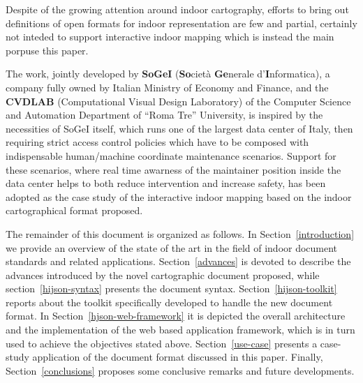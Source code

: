 Despite of the growing attention around indoor cartography, efforts to bring out definitions of open formats for indoor representation are few and partial, certainly not inteded to support interactive indoor mapping which is instead the main porpuse this paper. 

The work, jointly developed by {\bf SoGeI} ({\bf So}ciet\`a {\bf Ge}nerale d'{\bf I}nformatica), a company fully owned by Italian  Ministry of Economy and Finance, and the {\bf CVDLAB} (Computational Visual Design Laboratory) of the Computer Science and Automation Department of ``Roma Tre'' University, is inspired by the necessities of SoGeI itself, which runs one of the largest data center of Italy, then requiring strict access control policies which have to be composed with indispensable human/machine coordinate maintenance scenarios. Support for these scenarios, where real time awarness of the maintainer position inside the data center helps to both reduce intervention and increase safety, has been adopted as the case study of the interactive indoor mapping based on the indoor cartographical format proposed.


The remainder of this document is organized as follows. In Section~\ref{introduction} we
provide an overview of the state of the art in the field of indoor document
standards and related applications. Section~\ref{advances} is devoted to describe the
advances introduced by the novel cartographic document proposed, while section~\ref{hijson-syntax} presents the document syntax. Section~\ref{hijson-toolkit} reports about the toolkit
specifically developed to handle the new document format. In Section~\ref{hjson-web-framework} it is
depicted the overall architecture and the implementation of the web based
application framework, which is in turn used to achieve the objectives stated above. Section~\ref{use-case} presents a case-study application of the document format discussed in this paper.
Finally, Section~\ref{conclusions} proposes some conclusive remarks and future developments.




